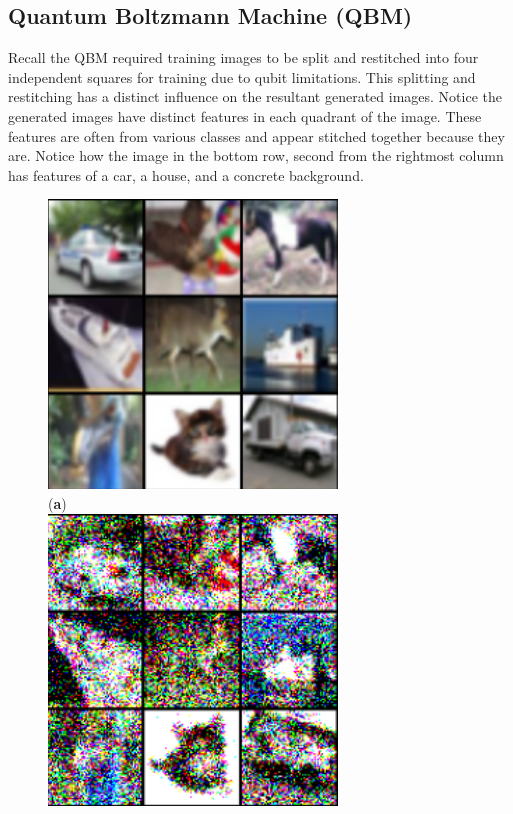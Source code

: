 \documentclass[technologies,article,accept,pdftex,moreauthors]{Definitions/mdpi}
\begin{document}
\subsection{Quantum Boltzmann Machine (QBM)}
\label{qbm_result_}
Recall the QBM required training images to be split and restitched into four independent squares for training due to qubit limitations. This splitting and restitching has a distinct influence on the resultant generated images. Notice the generated images have distinct features in each quadrant of the image. These features are often from various classes and appear stitched together because they are. Notice how the image in the bottom row, second from the rightmost column has features of a car, a house, and a concrete background.

\begin{figure}[H] 
        \includegraphics[width=.77\linewidth]{rbmin.png}\\
\text{~~~~~~~~~~~~~~~~~~~~~~~~~~~~~~~~~~~~~~~~~~~~~~~~~~~~~~~~}(\textbf{a}) 
        \label{fig:rbmin} \\
        \includegraphics[width=.77\linewidth]{rbmout.png}\\

\end{figure}
\end{document}
